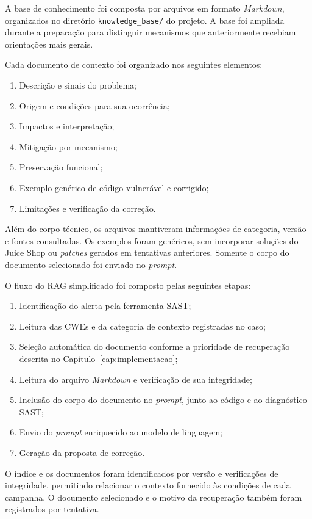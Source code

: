 A base de conhecimento foi composta por arquivos em formato \textit{Markdown}, organizados no diretório \texttt{knowledge\_base/} do projeto. A base foi ampliada durante a preparação para distinguir mecanismos que anteriormente recebiam orientações mais gerais.

Cada documento de contexto foi organizado nos seguintes elementos:

\begin{enumerate}
    \item Descrição e sinais do problema;
    \item Origem e condições para sua ocorrência;
    \item Impactos e interpretação;
    \item Mitigação por mecanismo;
    \item Preservação funcional;
    \item Exemplo genérico de código vulnerável e corrigido;
    \item Limitações e verificação da correção.
\end{enumerate}

Além do corpo técnico, os arquivos mantiveram informações de categoria, versão e fontes consultadas. Os exemplos foram genéricos, sem incorporar soluções do Juice Shop ou \textit{patches} gerados em tentativas anteriores. Somente o corpo do documento selecionado foi enviado no \textit{prompt}.

O fluxo do RAG simplificado foi composto pelas seguintes etapas:

\begin{enumerate}
    \item Identificação do alerta pela ferramenta SAST;
    \item Leitura das CWEs e da categoria de contexto registradas no caso;
    \item Seleção automática do documento conforme a prioridade de recuperação descrita no Capítulo~\ref{cap:implementacao};
    \item Leitura do arquivo \textit{Markdown} e verificação de sua integridade;
    \item Inclusão do corpo do documento no \textit{prompt}, junto ao código e ao diagnóstico SAST;
    \item Envio do \textit{prompt} enriquecido ao modelo de linguagem;
    \item Geração da proposta de correção.
\end{enumerate}

O índice e os documentos foram identificados por versão e verificações de integridade, permitindo relacionar o contexto fornecido às condições de cada campanha. O documento selecionado e o motivo da recuperação também foram registrados por tentativa.

